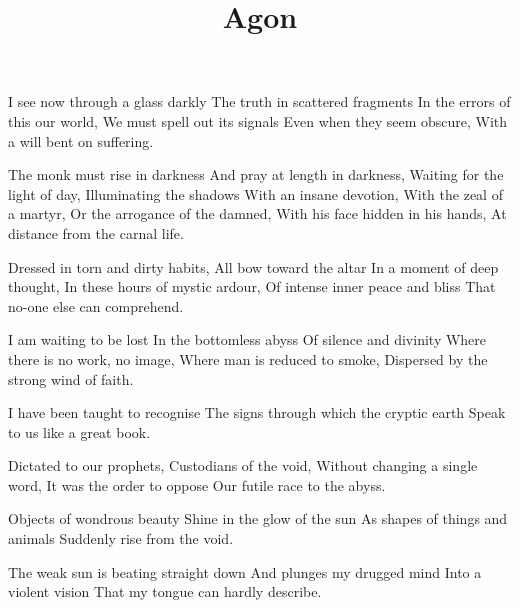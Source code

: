\documentclass{article}
\title{Agon}
\newenvironment{stanza}{\begin{minipage}{10cm}\obeylines}{\end{minipage}\vspace{\baselineskip}}
\begin{document}
\maketitle

\clearpage


\begin{stanza}
I see now through a glass darkly
The truth in scattered fragments
In the errors of this our world,
We must spell out its signals
Even when they seem obscure,
With a will bent on suffering.
\end{stanza}

\begin{stanza}
The monk must rise in darkness
And pray at length in darkness,
Waiting for the light of day,
Illuminating the shadows
With an insane devotion,
With the zeal of a martyr,
Or the arrogance of the damned,
With his face hidden in his hands,
At distance from the carnal life.
\end{stanza}

\begin{stanza}
Dressed in torn and dirty habits,
All bow toward the altar
In a moment of deep thought,
In these hours of mystic ardour,
Of intense inner peace and bliss
That no-one else can comprehend.
\end{stanza}

\begin{stanza}
I am waiting to be lost
In the bottomless abyss
Of silence and divinity
Where there is no work, no image,
Where man is reduced to smoke,
Dispersed by the strong wind of faith.
\end{stanza}

\begin{stanza}
I have been taught to recognise
The signs through which the cryptic earth
Speak to us like a great book.
\end{stanza}

\begin{stanza}
Dictated to our prophets,
Custodians of the void,
Without changing a single word,
It was the order to oppose
Our futile race to the abyss.
\end{stanza}

\begin{stanza}
Objects of wondrous beauty
Shine in the glow of the sun
As shapes of things and animals
Suddenly rise from the void.
\end{stanza}

\begin{stanza}
The weak sun is beating straight down
And plunges my drugged mind
Into a violent vision
That my tongue can hardly describe.
\end{stanza}
\end{document}

